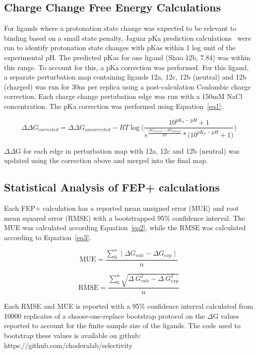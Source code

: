 \documentclass[phd,tocprelim]{cornell}
\begin{document}
\subsection{Charge Change Free Energy Calculations} 
For ligands where a protonation state change was expected to be relevant to binding based on a small state penalty, Jaguar pKa prediction calculations~\citep{Bochevarov2013-bn} were run to identify protonation state changes with pKas within 1 log unit of the experimental pH. The predicted pKas for one ligand (Shao 12b, 7.84) was within this range. To account for this, a pKa correction was performed. For this ligand, a separate perturbation map containing ligands 12a, 12c, 12b (neutral) and 12b (charged) was run for 30ns per replica using a post-calculation Coulombic charge correction. Each charge change pertubation edge was run with a 150mM NaCl concentration. The pKa correction was performed using Equation~\ref{eq1}: 

\begin{equation}\label{eq1}
\Delta\Delta G_{corrected} = \Delta\Delta G_{uncorrected} - RT\log\Bigg(\frac{10^{pK_a -pH}+1}{e^{\frac{\Delta G_{neutral} - \Delta G_{charged}}{RT}} * \big(10^{pK_a - pH}+1\big)}\Bigg)
\end{equation}

$\Delta\Delta$G for each edge in perturbation map with 12a, 12c and 12b (neutral) was updated using the correction above and merged into the final map. 

 
\subsection{Statistical Analysis of FEP+ calculations}
Each FEP+ calculation has a reported mean unsigned error (MUE) and root mean squared error (RMSE) with a bootstrapped 95\% confidence interval. The MUE was calculated according Equation~\ref{eq2}, while the RMSE was calculated according to Equation~\ref{eq3}. 

\begin{equation}\label{eq2}
\text{MUE} = \frac{ \sum_{0}^{n} \mid \Delta G _{calc} - \Delta G _{exp} \mid}{n}
 \end{equation}
 
 \begin{equation}\label{eq3}
\text{RMSE} = \frac{ \sum_{0}^{n} \sqrt{\Delta~G_{calc}^2 - \Delta~G_{exp}^2}}{n} 
 \end{equation}
 
 Each RMSE and MUE is reported with a 95\% confidence interval calculated from 10000 replicates of a choose-one-replace bootstrap protocol on the $\Delta$G values reported to account for the finite sample size of the ligands. The code used to bootstrap these values is available on github: https://github.com/choderalab/selectivity
 
\end{document}
